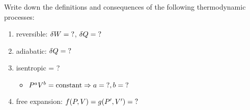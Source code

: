 

\vspace*{\fill}
\centering

Write down the definitions and consequences of the following thermodynamic processes:
\begin{enumerate}
    \item reversible: $\delta W = {\rm ?}$, $\delta Q = {\rm ?}$
    \item adiabatic: $\delta Q = {\rm ?}$
    \item isentropic = ?
        \begin{itemize}
            \item $P^{a}V^{b} = {\rm constant} \Rightarrow a = {\rm ?},b = {\rm ?}$ 
        \end{itemize}
    \item free expansion: $f(P,V) = g(P',V') = {\rm ?}$
\end{enumerate}

\centering
\vspace*{\fill}

